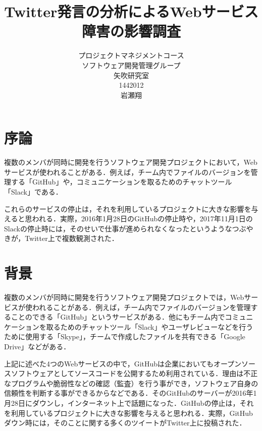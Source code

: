 \title{Twitter発言の分析によるWebサービス障害の影響調査}
\author{プロジェクトマネジメントコース\\
ソフトウェア開発管理グループ\\
矢吹研究室\\
1442012\\
岩瀬翔}

\date{}
\usepackage{listings}
\usepackage{seqsplit}
\makeatletter
\def\lst@lettertrue{\let\lst@ifletter\iffalse}
\makeatother

\maketitle



\tableofcontents%

\chapter{序論}
複数のメンバが同時に開発を行うソフトウェア開発プロジェクトにおいて，Webサービスが使われることがある．例えば，チーム内でファイルのバージョンを管理する「GitHub」や，コミュニケーションを取るためのチャットツール「Slack」である．

これらのサービスの停止は，それを利用しているプロジェクトに大きな影響を与えると思われる．実際，2016年1月28日のGitHubの停止時\cite{02}や，2017年11月1日のSlackの停止時\cite{slack}には，そのせいで仕事が進められなくなったというようなつぶやきが，Twitter上で複数観測された．

\chapter{背景}
複数のメンバが同時に開発を行うソフトウェア開発プロジェクトでは，Webサービスが使われることがある．例えば，チーム内でファイルのバージョンを管理することのできる「GitHub」というサービスがある．他にもチーム内でコミュニケーションを取るためのチャットツール「Slack」やユーザレビューなどを行うために使用する「Skype」，チームで作成したファイルを共有できる「Google Drive」などがある．

上記に述べた4つのWebサービスの中で，GitHubは企業においてもオープンソースソフトウェアとしてソースコードを公開するため利用されている．理由は不正なプログラムや脆弱性などの確認（監査）を行う事ができ，ソフトウェア自身の信頼性を判断する事ができるからなどである\cite{01}．そのGitHubのサーバーが2016年1月28日にダウンし，インターネット上で話題になった．GitHubの停止は，それを利用しているプロジェクトに大きな影響を与えると思われる．実際，GitHubダウン時には，そのことに関する多くのツイートがTwitter上に投稿された．

